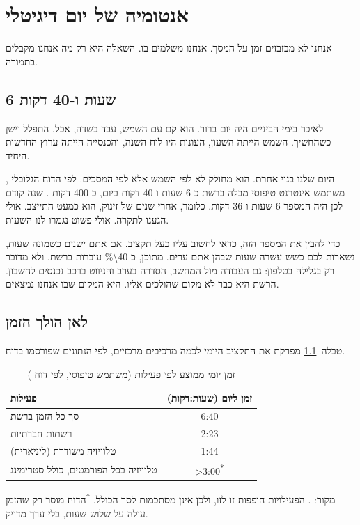 \chapter{אנטומיה של יום דיגיטלי}

\begin{epigraph}{}
אנחנו לא מבזבזים זמן על המסך. אנחנו משלמים בו. השאלה היא רק מה אנחנו מקבלים בתמורה.
\end{epigraph}

\section{6 שעות ו-40 דקות}

לאיכר בימי הביניים היה יום ברור. הוא קם עם השמש, עבד בשדה, אכל, התפלל וישן כשהחשיך. השמש הייתה השעון, העונות היו לוח השנה, והכנסייה הייתה ערוץ החדשות היחיד.

היום שלנו בנוי אחרת. הוא מחולק לא לפי השמש אלא לפי המסכים. לפי הדוח הגלובלי , משתמש אינטרנט טיפוסי מבלה ברשת כ-6 שעות ו-40 דקות ביום, כ-400 דקות \parencite{kemp2024}. שנה קודם לכן היה המספר 6 שעות ו-36 דקות. כלומר, אחרי שנים של זינוק, הוא כמעט התייצב. אולי הגענו לתקרה. אולי פשוט נגמרו לנו השעות.

כדי להבין את המספר הזה, כדאי לחשוב עליו כעל תקציב. אם אתם ישנים כשמונה שעות, נשארות לכם כשש-עשרה שעות שבהן אתם ערים. מתוכן, כ-\num{40\%} עוברות ברשת. ולא מדובר רק בגלילה בטלפון: גם העבודה מול המחשב, הסדרה בערב והניווט ברכב נכנסים לחשבון. הרשת היא כבר לא מקום שהולכים אליו. היא המקום שבו אנחנו נמצאים.

\section{לאן הולך הזמן}

טבלה~\ref{tab:daily-time} מפרקת את התקציב היומי לכמה מרכיבים מרכזיים, לפי הנתונים שפורסמו בדוח.

\begin{table}[htbp]
\centering
\caption{זמן יומי ממוצע לפי פעילות (משתמש טיפוסי, לפי דוח )}
\label{tab:daily-time}
\begin{tabularx}{0.9\textwidth}{@{}X c@{}}
\toprule
\textbf{פעילות} & \textbf{זמן ליום (שעות:דקות)} \\
\midrule
סך כל הזמן ברשת & \num{6:40} \\
רשתות חברתיות & \num{2:23} \\
טלוויזיה משודרת (ליניארית) & \num{1:44} \\
טלוויזיה בכל הפורמטים, כולל סטרימינג & \num{>3:00}\textsuperscript{*} \\
\bottomrule
\end{tabularx}

\vspace{0.3em}
{\small\sffamily מקור: \textcite{kemp2024}. הפעילויות חופפות זו לזו, ולכן אינן מסתכמות לסך הכולל. \textsuperscript{*}הדוח מוסר רק שהזמן עולה על שלוש שעות, בלי ערך מדויק.}
\end{table}

